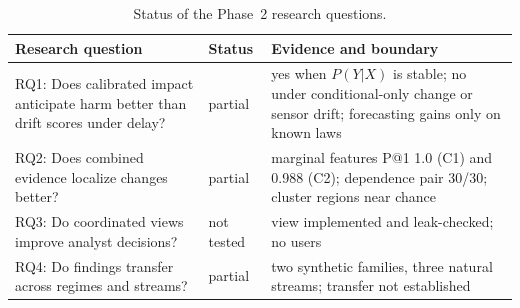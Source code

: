 \begin{table}[t]
\centering
\caption{Status of the Phase~2 research questions.}
\label{tab:rq}
\setlength{\tabcolsep}{3pt}
\footnotesize
\begin{tabular}{L{3.2cm}L{1.15cm}L{3.6cm}}
\toprule
Research question & Status & Evidence and boundary \\
\midrule
RQ1: Does calibrated impact anticipate harm better than drift scores under delay? & partial & yes when $P(Y|X)$ is stable; no under conditional-only change or sensor drift; forecasting gains only on known laws \\
RQ2: Does combined evidence localize changes better? & partial & marginal features P@1 1.0 (C1) and 0.988 (C2); dependence pair 30/30; cluster regions near chance \\
RQ3: Do coordinated views improve analyst decisions? & not tested & view implemented and leak-checked; no users \\
RQ4: Do findings transfer across regimes and streams? & partial & two synthetic families, three natural streams; transfer not established \\
\bottomrule
\end{tabular}
\end{table}
